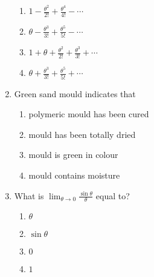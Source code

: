 \documentclass[journal,12pt,onecolumn]{IEEEtran}
\theoremstyle{remark}
\begin{document}
\begin{enumerate}
\begin{multicols}{2}
             \begin{enumerate}
                 \item $ 1 - \frac{\theta^2}{2!} + \frac{\theta^4}{4!} - \cdots $
                 \item $ \theta - \frac{\theta^3}{3!} + \frac{\theta^5}{5!} - \cdots $
                 \item $ 1 + \theta + \frac{\theta^2}{2!} + \frac{\theta^3}{3!} + \cdots $
                 \item $ \theta + \frac{\theta^3}{3!} + \frac{\theta^5}{5!} + \cdots $
             \end{enumerate}
                 \end{multicols}
            \item Green sand mould indicates that         
            \begin{multicols}{2}
             \begin{enumerate}
                 \item polymeric mould has been cured
                 \item mould has been totally dried
                 \item mould is green in colour
                 \item mould contains moisture
             \end{enumerate}
                 \end{multicols}
            \item What is $\lim_{\theta \to 0} \frac{\sin \theta}{\theta}$ equal to?
            \begin{multicols}{2}
            \begin{enumerate}
            \item $\theta$
            \item $\sin \theta$
            \item $0$
            \item $1$
            \end{enumerate}
            \end{multicols}
\end{enumerate}
\end{document}
